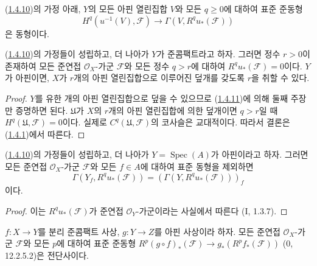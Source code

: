 \begin{corollary}[1.4.11]
\label{III.1.4.11-fr}
(\hyperref[III.1.4.10-fr]{1.4.10})의 가정 아래, $Y$의 모든 아핀
열린집합 $V$와 모든 $q\geq0$에 대하여 표준 준동형
\begin{equation}
\label{III.1.4.11.1-fr}
\tag{1.4.11.1}
H^q(u^{-1}(V),\mathcal F)\longrightarrow
\Gamma(V,R^qu_*(\mathcal F))
\end{equation}
은 동형이다.
\end{corollary}

\begin{corollary}[1.4.12]
\label{III.1.4.12-fr}
(\hyperref[III.1.4.10-fr]{1.4.10})의 가정들이 성립하고, 더 나아가
$Y$가 준콤팩트라고 하자. 그러면 정수 $r>0$이 존재하여 모든 준연접
$\mathcal O_X$-가군 $\mathcal F$와 모든 정수 $q>r$에 대하여
$R^qu_*(\mathcal F)=0$이다. $Y$가 아핀이면, $X$가 $r$개의 아핀
열린집합으로 이루어진 덮개를 갖도록 $r$을 취할 수 있다.
\end{corollary}

\begin{proof}
$Y$를 유한 개의 아핀 열린집합으로 덮을 수 있으므로
(\hyperref[III.1.4.11-fr]{1.4.11})에 의해 둘째 주장만 증명하면 된다.
$\mathfrak U$가 $X$의 $r$개의 아핀 열린집합에 의한 덮개이면
$q>r$일 때 $H^q(\mathfrak U,\mathcal F)=0$이다. 실제로
$C^q(\mathfrak U,\mathcal F)$의 코사슬은 교대적이다. 따라서 결론은
(\hyperref[III.1.4.1-fr]{1.4.1})에서 따른다.
\end{proof}

\begin{corollary}[1.4.13]
\label{III.1.4.13-fr}
(\hyperref[III.1.4.10-fr]{1.4.10})의 가정들이 성립하고, 더 나아가
$Y=\operatorname{Spec}(A)$가 아핀이라고 하자. 그러면 모든 준연접
$\mathcal O_X$-가군 $\mathcal F$와 모든 $f\in A$에 대하여 표준 동형을
제외하면
\[
\Gamma(Y_f,R^qu_*(\mathcal F))
=(\Gamma(Y,R^qu_*(\mathcal F)))_f
\]
이다.
\end{corollary}

\begin{proof}
이는 $R^qu_*(\mathcal F)$가 준연접 $\mathcal O_Y$-가군이라는 사실에서
따른다 (I, 1.3.7).
\end{proof}

\begin{proposition}[1.4.14]
\label{III.1.4.14-fr}
$f:X\to Y$를 분리 준콤팩트 사상, $g:Y\to Z$를 아핀 사상이라 하자.
모든 준연접 $\mathcal O_X$-가군 $\mathcal F$와 모든 $p$에 대하여
표준 준동형
$R^p(g\circ f)_*(\mathcal F)\to g_*(R^pf_*(\mathcal F))$
(0, 12.2.5.2)은 전단사이다.
\end{proposition}

